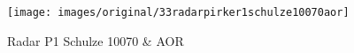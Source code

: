 \begin{figure}[!h] 
\centering 
\texttt{[image: images/original/33radarpirker1schulze10070aor]}
\caption{Radar P1 Schulze 10070 & AOR}
\label{fig:33radarpirker1schulze10070aor} 
\end{figure}


